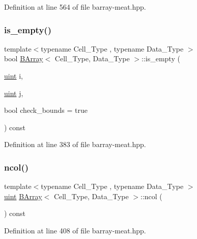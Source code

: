 Definition at line 564 of file barray-\/meat.\+hpp.

\mbox{\label{class_b_array_a37ed3962c0ee5030b23cb6cde23a5cdf}} 
\subsubsection{\texorpdfstring{is\+\_\+empty()}{is\_empty()}}
{\footnotesize\ttfamily template$<$typename Cell\+\_\+\+Type , typename Data\+\_\+\+Type $>$ \\
bool \hyperlink{class_b_array}{B\+Array}$<$ Cell\+\_\+\+Type, Data\+\_\+\+Type $>$\+::is\+\_\+empty (\begin{DoxyParamCaption}\item[{\hyperlink{typedefs_8hpp_a91ad9478d81a7aaf2593e8d9c3d06a14}{uint}}]{i,  }\item[{\hyperlink{typedefs_8hpp_a91ad9478d81a7aaf2593e8d9c3d06a14}{uint}}]{j,  }\item[{bool}]{check\+\_\+bounds = {\ttfamily true} }\end{DoxyParamCaption}) const\hspace{0.3cm}{\ttfamily [inline]}}



Definition at line 383 of file barray-\/meat.\+hpp.

\mbox{\label{class_b_array_ac669bd57e3cbf4c60bf2b4a459dcdc4f}} 
\subsubsection{\texorpdfstring{ncol()}{ncol()}}
{\footnotesize\ttfamily template$<$typename Cell\+\_\+\+Type , typename Data\+\_\+\+Type $>$ \\
\hyperlink{typedefs_8hpp_a91ad9478d81a7aaf2593e8d9c3d06a14}{uint} \hyperlink{class_b_array}{B\+Array}$<$ Cell\+\_\+\+Type, Data\+\_\+\+Type $>$\+::ncol (\begin{DoxyParamCaption}{ }\end{DoxyParamCaption}) const\hspace{0.3cm}{\ttfamily [inline]}}



Definition at line 408 of file barray-\/meat.\+hpp.

